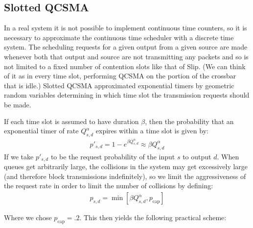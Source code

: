 \documentclass{IEEEtran}%
\begin{document}
\subsection{Slotted QCSMA} \label{naive_qcsma}


In a real system it is not possible to implement continuous time counters, so it is necessary to approximate the continuous time scheduler with a discrete time system.  The scheduling requests for a given output from a given source are made whenever both that output and source are not transmitting any packets and so is not limited to a fixed number of contention slots like that of Slip.  (We can think of it as in every time slot, performing QCSMA on the portion of the crossbar that is idle.)  Slotted QCSMA approximated exponential timers by geometric random variables determining in which time slot the transmission requests should be made.

If each time slot is assumed to have duration $\beta$, then the probability that an exponential timer of rate $Q_{s,d}^\alpha$ expires within a time slot is given by:
\begin{align}
p'_{s,d} =1-e^{\beta Q_{s,d}^\alpha} \approx \beta Q_{s,d}^\alpha
\end{align}
If we take $p'_{s,d}$ to be the request probability of the input $s$ to output $d$.  When queues get arbitrarily large, the collisions in the system may get excessively large (and therefore block transmissions indefinitely), so we limit the aggressiveness of the request rate in order to limit the number of collisions by defining:
\begin{align}  \label{geo_p}
p_{s,d} =\min \left[ \beta Q_{s,d}^\alpha,p_{\text{cap}}\right]
\end{align}

Where we chose $p_{\text{cap}}=.2$.  This then yields the following practical scheme:\\
\end{document}
